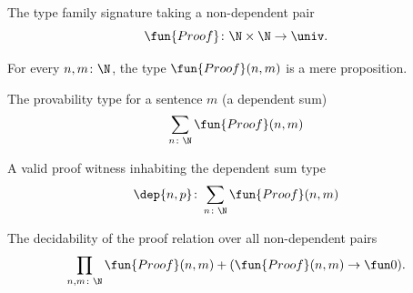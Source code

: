 \newpage


The type family signature taking a non-dependent pair
\[
    \fun{Proof}\colon\N\times\N\to\univ.
\]

\begin{thm}
    For every\/ $n,m\colon\N$, the type\/ $\fun{Proof}(n,m)$ is a mere proposition.
\end{thm}

The provability type for a sentence $m$ (a dependent sum)
\[
    \sum_{n\colon\N}\fun{Proof}(n,m)
\]

A valid proof witness inhabiting the dependent sum type
\[
    \dep{n,p}\colon\sum_{n\colon\N}
        \fun{Proof}(n,m)
\]

The decidability of the proof relation over all non-dependent pairs
\[
    \prod_{n,m\colon\N}
        \fun{Proof}(n,m)+(\fun{Proof}(n,m)\to\fun0).
\]